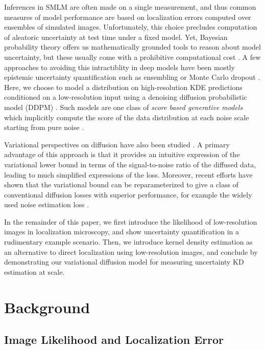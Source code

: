 \documentclass{article}
\begin{document}
Inferences in SMLM are often made on a single measurement, and thus common measures of model performance are based on localization errors computed over ensembles of simulated images. Unfortunately, this choice precludes computation of aleatoric uncertainty at test time under a fixed model. Yet, Bayesian probability theory offers us mathematically grounded tools to reason about model uncertainty, but these usually come with a prohibitive computational cost \citep{Gal2022}. A few approaches to avoiding this intractiblity in deep models have been mostly epistemic uncertainty quantification such as ensembling \citep{Lakshminarayanan2017} or Monte Carlo dropout \citep{Gal2022}. Here, we choose to model a distribution on high-resolution KDE predictions conditioned on a low-resolution input using a denoising diffusion probabilistic model (DDPM) \citep{Ho2020,Song2021}. Such models are one class of \emph{score based generative models} which implicitly compute the score of the data distribution at each noise scale starting from pure noise \citep{Song2021}. 

Variational perspectives on diffusion have also been studied \citep{Dirmeier2023,Ribeiro2024,Kingma2021,Kingma2023}.  A
primary advantage of this approach is that it provides an intuitive expression of the variational lower bound in terms of the signal-to-noise ratio of the diffused data, leading to much simplified expressions of the loss. Moreover, recent efforts have shown that the variational bound can be reparameterized to give a class of conventional diffusion losses with superior performance, for example the widely used noise estimation loss \citep{Ho2020}. 

In the remainder of this paper, we first introduce the likelihood of low-resolution images in localization microscopy, and show uncertainty quantification in a rudimentary example scenario. Then, we introduce kernel density estimation as an alternative to direct localization using low-resolution images, and conclude by demonstrating our variational diffusion model for measuring uncertainty KD estimation at scale. 

\section{Background}

\subsection{Image Likelihood and Localization Error}
\end{document}
